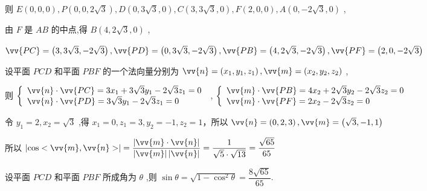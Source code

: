 \begin{enumerate}
\begin{jieda}
\begin{enumerate}
            则 $E\left( {0,0,0}\right) ,P\left( {0,0,2\sqrt{3}}\right) ,D\left( {0,3\sqrt{3},0}\right) ,C\left( {3,3\sqrt{3},0}\right) ,F\left( {2,0,0}\right) ,A\left( {0, - 2\sqrt{3},0}\right)$ ,

            由 $F$ 是 ${AB}$ 的中点,得 $B\left( {4,2\sqrt{3},0}\right)$ ,

            $\vv{PC} = \left( {3,3\sqrt{3}, - 2\sqrt{3}}\right) ,\vv{PD} = \left( {0,3\sqrt{3}, - 2\sqrt{3}}\right) ,\vv{PB} = \left( {4,2\sqrt{3}, - 2\sqrt{3}}\right) ,\vv{PF} = \left( {2,0, - 2\sqrt{3}}\right)$

            设平面 ${PCD}$ 和平面 ${PBF}$ 的一个法向量分别为 $\vv{n} = \left( {{x}_{1},{y}_{1},{z}_{1}}\right) ,\vv{m} = \left( {{x}_{2},{y}_{2},{z}_{2}}\right)$ ,


            则 $\left\{  \begin{array}{l} \vv{n} \cdot  \vv{PC} = 3{x}_{1} + 3\sqrt{3}{y}_{1} - 2\sqrt{3}{z}_{1} = 0 \\  \vv{n} \cdot  \vv{PD} = 3\sqrt{3}{y}_{1} - 2\sqrt{3}{z}_{1} = 0 \end{array}\right.$ , $\left\{  \begin{array}{l} \vv{m} \cdot  \vv{PB} = 4{x}_{2} + 2\sqrt{3}{y}_{2} - 2\sqrt{3}{z}_{2} = 0 \\  \vv{m} \cdot  \vv{PF} = 2{x}_{2} - 2\sqrt{3}{z}_{2} = 0 \end{array}\right.$

            令 ${y}_{1} = 2,{x}_{2} = \sqrt{3}$ ,得 ${x}_{1} = 0,{z}_{1} = 3,{y}_{2} =  - 1,{z}_{2} = 1$，所以 $\vv{n} = \left( {0,2,3}\right) ,\vv{m} = \left( {\sqrt{3}, - 1,1}\right)$

            所以 $\left| {\cos <\vv{m},\vv{n}}>\right|  = \dfrac{\left| \vv{m} \cdot  \vv{n}\right| }{\left| \vv{m}\right| \left| \vv{n}\right| } = \dfrac{1}{\sqrt{5} \cdot  \sqrt{13}} = \dfrac{\sqrt{65}}{65}$

            设平面 ${PCD}$ 和平面 ${PBF}$ 所成角为 $\theta$ ,则 $\sin \theta  = \sqrt{1 - {\cos }^{2}\theta } = \dfrac{8\sqrt{65}}{65}$.
        \end{enumerate}
    \end{jieda}


\end{enumerate}
